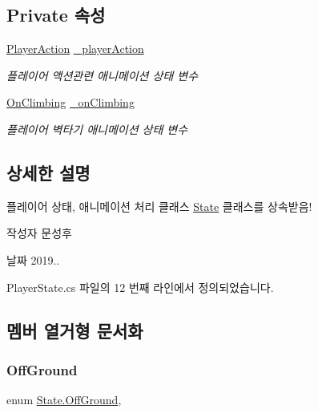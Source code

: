 \subsection*{Private 속성}
\begin{DoxyCompactItemize}
\item 
\mbox{\hyperlink{class_player_state_a2909421d9f22a750c1b0eacfc9bafb3d}{Player\+Action}} \mbox{\hyperlink{class_player_state_a50343c632d4e11c55e97a58b4c9520ad}{\+\_\+player\+Action}}
\begin{DoxyCompactList}\small\item\em 플레이어 액션관련 애니메이션 상태 변수 \end{DoxyCompactList}\item 
\mbox{\hyperlink{class_player_state_a16e115e2b4c8d0420119d6ff2fe8b3bc}{On\+Climbing}} \mbox{\hyperlink{class_player_state_a779507cee79095e3bbd9e6e1f7f8b8a8}{\+\_\+on\+Climbing}}
\begin{DoxyCompactList}\small\item\em 플레이어 벽타기 애니메이션 상태 변수 \end{DoxyCompactList}\end{DoxyCompactItemize}


\subsection{상세한 설명}
플레이어 상태, 애니메이션 처리 클래스 \mbox{\hyperlink{class_state}{State}} 클래스를 상속받음! 

\begin{DoxyAuthor}{작성자}
문성후 
\end{DoxyAuthor}
\begin{DoxyDate}{날짜}
2019.. 
\end{DoxyDate}


Player\+State.\+cs 파일의 12 번째 라인에서 정의되었습니다.



\subsection{멤버 열거형 문서화}
\mbox{\label{class_state_a7d945e793324c017a973205564cf1a56}} 
\subsubsection{\texorpdfstring{OffGround}{OffGround}}
{\footnotesize\ttfamily enum \mbox{\hyperlink{class_state_a7d945e793324c017a973205564cf1a56}{State.\+Off\+Ground}}\hspace{0.3cm}{\ttfamily [strong]}, {\ttfamily [inherited]}}

